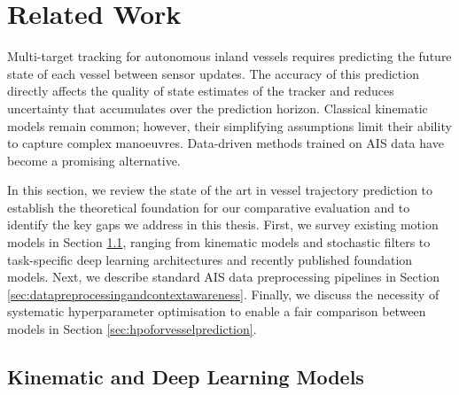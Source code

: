 
\chapter{Related Work}
\acresetall %
\label{chap:relatedwork}

Multi-target tracking for autonomous inland vessels requires predicting the future state of each vessel between sensor updates.
The accuracy of this prediction directly affects the quality of state estimates of the tracker and reduces uncertainty that accumulates over the prediction horizon.
Classical kinematic models remain common; however, their simplifying assumptions limit their ability to capture complex manoeuvres.
Data-driven methods trained on \ac{AIS} data have become a promising alternative.

In this section, we review the state of the art in vessel trajectory prediction 
 to establish the theoretical foundation for our comparative evaluation and to identify the key gaps we address in this thesis. First, we survey existing motion models in Section \ref{sec:kinematicanddeeplearningmodels}, ranging from kinematic models and stochastic filters to task-specific deep learning architectures and recently published foundation models. Next, we describe  standard \acs{AIS} data preprocessing pipelines in Section \ref{sec:datapreprocessingandcontextawareness}. %
Finally, we discuss the necessity of systematic hyperparameter optimisation to enable a fair comparison between models in Section \ref{sec:hpoforvesselprediction}.

\section{Kinematic and Deep Learning Models} 
\label{sec:kinematicanddeeplearningmodels}



